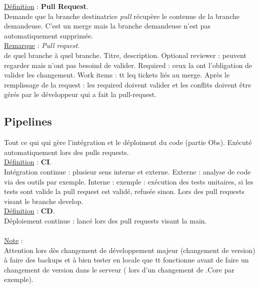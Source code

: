 \documentclass[a4paper,12pt,twoside]{article}
\newcommand{\rem}[2]{\noindent\underline{Remarque} : \textit{#1}.\\ \indent #2}
\newcommand{\note}[1]{\noindent\underline{Note} : \\ \indent #1}
\newcommand{\defi}[2]{\noindent\underline{Définition} : \textbf{#1}.\\ \indent #2}
\begin{document}
\defi{Pull Request}{Demande que la branche destinatrice \textit{pull} récupère le contenue de la branche demandeuse. C'est un merge mais la branche demandeuse n'est pas automatiquement supprimée.}\\

\rem{Pull request}{de quel branche à quel branche. Titre, description. Optional reviewer : peuvent regarder mais n'ont pas besoind de valider. Required : ceux la ont l'obligation de valider les changement. Work items : tt leq tickets liés au merge. Après le remplissage de la request : les required doivent valider et les conflits doivent être gérés par le développeur qui a fait la pull-request.}\\

\subsection{Pipelines}

Tout ce qui qui gère l'intégration et le déploiment du code (partie Obs). Exécuté automatiquement lors des pulls requests.\\

\defi{CI}{Intégration continue : plusieur sens interne et externe. Externe : analyse de code via des outils par exemple. Interne : exemple : exécution des tests unitaires, si les tests sont valide la pull request est validé, refusée sinon. Lors des pull requests visant le branche develop.}\\

\defi{CD}{Déploiement continue : lancé lors des pull requests visant la main.}\\

\\

\note{Attention lors dès changement de développement majeur (changement de version) à faire des backups et à bien tester en locale que tt fonctionne avant de faire un changement de version dans le serveur ( lors d'un changement de .Core par exemple).}\\
\end{document}
